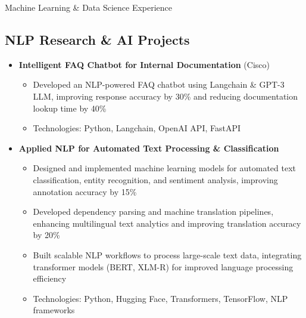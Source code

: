 \documentclass{resume} %
\begin{document}
\begin{rSection}{Machine Learning \& Data Science Experience}

    \subsection*{NLP Research \& AI Projects}
        \begin{itemize}
            \item \textbf{Intelligent FAQ Chatbot for Internal Documentation} (Cisco)
                \begin{itemize}
                    \item Developed an NLP-powered FAQ chatbot using Langchain \& GPT-3 LLM, improving response accuracy by 30\% and reducing documentation lookup time by 40\%
                    \item Technologies: Python, Langchain, OpenAI API, FastAPI
                \end{itemize}
            \item \textbf{Applied NLP for Automated Text Processing \& Classification}
                \begin{itemize}
                    \item Designed and implemented machine learning models for automated text classification, entity recognition, and sentiment analysis, improving annotation accuracy by 15\%
                    \item Developed dependency parsing and machine translation pipelines, enhancing multilingual text analytics and improving translation accuracy by 20\%
                    \item Built scalable NLP workflows to process large-scale text data, integrating transformer models (BERT, XLM-R) for improved language processing efficiency
                    \item Technologies: Python, Hugging Face, Transformers, TensorFlow, NLP frameworks
                \end{itemize}
        \end{itemize}


\end{rSection}
\end{document}
